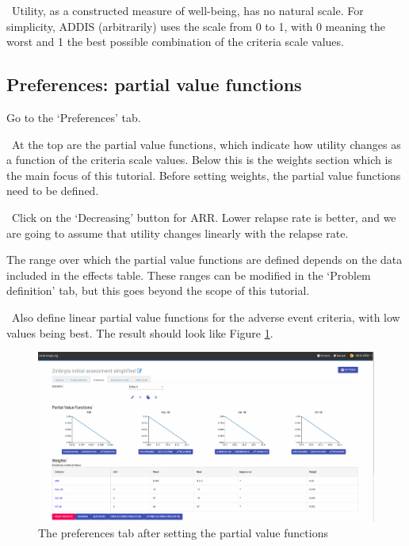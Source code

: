 \documentclass[00_mcda_tutorial.tex]{subfiles}
\begin{document}
\noindent \faGraduationCap \, Utility, as a constructed measure of well-being, has no natural scale. For simplicity, ADDIS (arbitrarily) uses the scale from 0 to 1, with 0 meaning the worst and 1 the best possible combination of the criteria scale values.

\subsection*{Preferences: partial value functions}
\leftpointright Go to the ‘Preferences’ tab.
\newline

\noindent \faGraduationCap \, At the top are the partial value functions, which indicate how utility changes as a function of the criteria scale values. Below this is the weights section which is the main focus of this tutorial. Before setting weights, the partial value functions need to be defined.
\newline

\noindent \leftpointright \, Click on the ‘Decreasing’ button for ARR. Lower relapse rate is better, and we are going to assume that utility changes linearly with the relapse rate.

\noindent The range over which the partial value functions are defined depends on the data included in the effects table. These ranges can be modified in the ‘Problem definition’ tab, but this goes beyond the scope of this tutorial.
\newline

\noindent \leftpointright \, Also define linear partial value functions for the adverse event criteria, with low values being best. The result should look like Figure \ref{fig:preferences}.
\newline

\begin{figure}[!h]
  \centering
  \includegraphics[width=\textwidth]{fig/preferences.png}
  \caption{The preferences tab after setting the partial value functions}
  \label{fig:preferences}
\end{figure}
\end{document}
